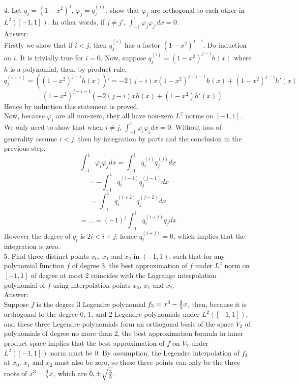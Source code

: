 \documentclass{article} %
\theoremstyle{break}
\begin{document}
4. Let $q_j=(1-x^2)^j$, $\varphi_j=q_j^{(j)}$, show that $\varphi_j$ are orthogonal to each other in $L^2([-1, 1])$. In other words, if $j\not=j'$, $\int_{-1}^1\varphi_j\varphi_{j'}dx=0$. \\

Answer:\\

Firstly we show that if $i<j$, then $q_j^{(i)}$ has a factor $(1-x^2)^{j-i}$. Do induction on $i$. It is trivially true for $i=0$. Now, suppose $q_j^{(i)}=(1-x^2)^{j-i}h(x)$ where $h$ is a polynomial, then, by product rule,
\[q_j^{(i+1)}=((1-x^2)^{j-i}h(x))'=-2(j-i)x(1-x^2)^{j-i-1}h(x)+(1-x^2)^{j-i}h'(x)\]
\[=(1-x^2)^{j-i-1}(-2(j-i)xh(x)+(1-x^2)h'(x))\]
Hence by induction this statement is proved.\\

Now, because $\varphi_i$ are all non-zero, they all have non-zero $L^2$ norms on $[-1, 1]$. We only need to show that when $i\not=j$, $\int_{-1}^1\varphi_i\varphi_jdx=0$. Without loss of generality assume $i<j$, then by integration by parts and the conclusion in the previous step,
\[\int_{-1}^1\varphi_i\varphi_jdx=\int_{-1}^1 q_i^{(i)}q_j^{(j)}dx\]
\[=-\int_{-1}^1q_i^{(i+1)}q_j^{(j-1)}dx\]
\[=\int_{-1}^1q_i^{(i+2)}q_j^{(j-2)}dx\]
\[=\dots=(-1)^j\int_{-1}^1q_i^{(i+j)}q_jdx\]
However the degree of $q_i$ is $2i<i+j$, hence $q_i^{(i+j)}=0$, which implies that the integration is zero.\\


5. Find three distinct points $x_0$, $x_1$ and $x_2$ in $(-1, 1)$, such that for any polynomial function $f$ of degree $3$, the best approximation of $f$ under $L^2$ norm on $[-1, 1]$ of degree at most $2$ coincides with the Lagrange interpolation polynomial of $f$ using interpolation points $x_0$, $x_1$ and $x_2$.\\

Answer:\\

Suppose $f$ is the degree 3 Legendre polynomial $f_3=x^3-{3\over 5}x$, then, because it is orthogonal to the degree 0, 1, and 2 Legendre polynomials under $L^2([-1, 1])$, and these three Legendre polynomials form an orthogonal basis of the space $V_2$ of polynomials of degree no more than 2, the best approximation formula in inner product space implies that the best approximation of $f$ on $V_2$ under $L^2([-1, 1])$ norm must be $0$. By assumption, the Legendre interpolation of $f_3$ at $x_0$, $x_1$ and $x_2$ must also be zero, so these three points can only be the three roots of $x^3-{3\over 5}x$, which are $0, \pm\sqrt{3\over 5}$.\\
\end{document}
